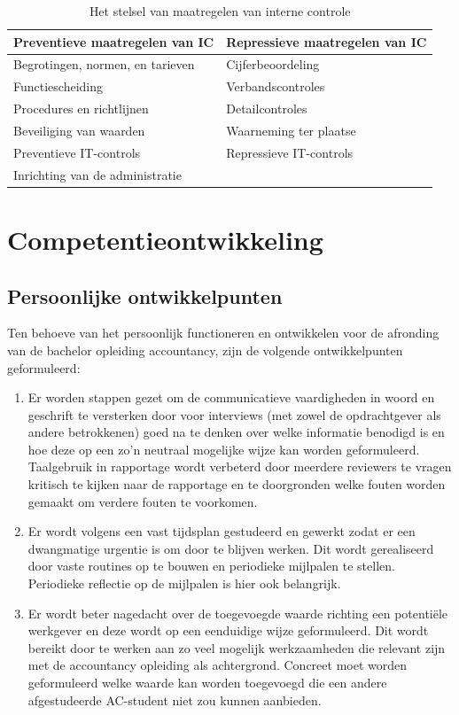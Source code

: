 \documentclass[10pt,a4paper,twoside]{report}
\begin{document}
\begin{table}[!h]
    \centering
    \caption{Het stelsel van maatregelen van interne controle \citep{bivpraktijk}}
    \begin{tabular}{l l}
        \toprule
        \textbf{Preventieve maatregelen van IC} & \textbf{Repressieve maatregelen van IC} \\
        \midrule
        Begrotingen, normen, en tarieven & Cijferbeoordeling \\
        Functiescheiding & Verbandscontroles \\
        Procedures en richtlijnen & Detailcontroles \\
        Beveiliging van waarden & Waarneming ter plaatse \\
        Preventieve IT-controls & Repressieve IT-controls \\
        Inrichting van de administratie \\
        \bottomrule
    \end{tabular}
    \label{tab:icmaatregelen}
\end{table}




\chapter{Competentieontwikkeling}
    \section{Persoonlijke ontwikkelpunten}
Ten behoeve van het persoonlijk functioneren en ontwikkelen voor de afronding van de bachelor opleiding accountancy, zijn de volgende ontwikkelpunten geformuleerd:
\begin{enumerate}
    \item Er worden stappen gezet om de communicatieve vaardigheden in woord en geschrift te versterken door voor interviews (met zowel de opdrachtgever als andere betrokkenen) goed na te denken over welke informatie benodigd is en hoe deze op een zo'n neutraal mogelijke wijze kan worden geformuleerd. Taalgebruik in rapportage wordt verbeterd door meerdere reviewers te vragen kritisch te kijken naar de rapportage en te doorgronden welke fouten worden gemaakt om verdere fouten te voorkomen. 
    \item Er wordt volgens een vast tijdsplan gestudeerd en gewerkt zodat er een dwangmatige urgentie is om door te blijven werken. Dit wordt gerealiseerd door vaste routines op te bouwen en periodieke mijlpalen te stellen. Periodieke reflectie op de mijlpalen is hier ook belangrijk.
    \item Er wordt beter nagedacht over de toegevoegde waarde richting een potentiële werkgever en deze wordt op een eenduidige wijze geformuleerd. Dit wordt bereikt door te werken aan zo veel mogelijk werkzaamheden die relevant zijn met de accountancy opleiding als achtergrond. Concreet moet worden geformuleerd welke waarde kan worden toegevoegd die een andere afgestudeerde AC-student niet zou kunnen aanbieden.
\end{enumerate}
\end{document}
